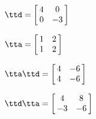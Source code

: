 {$\ttd = \left[\hskip -3pt \begin{array}{cc} 4&0\\  0&-3\end{array}\hskip -3pt
 \right]$
 
$\tta = \left[\hskip -3pt \begin{array}{cc} 1&2\\  1&2\end{array}\hskip -3pt
 \right] $}
{$\tta\ttd= \left[\hskip -3pt \begin{array}{cc} 4&-6\\  4&-6\end{array}\hskip -3pt
 \right] $

$\ttd\tta =  \left[\hskip -3pt \begin{array}{cc} 4&8\\  -3&-6\end{array}\hskip -3pt \right]$
}
  
